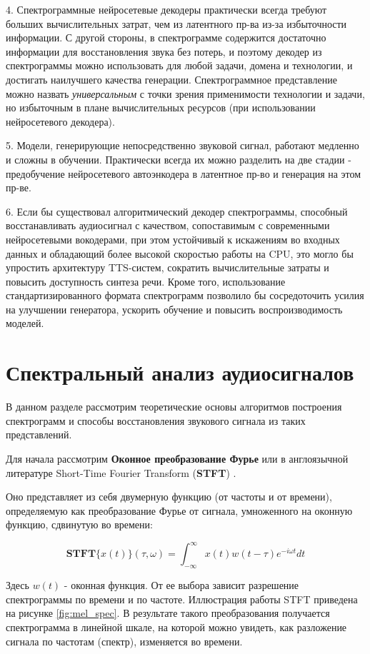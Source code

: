 4. Спектрограммные нейросетевые декодеры практически всегда требуют больших вычислительных затрат, чем из латентного пр-ва из-за избыточности информации. 
С другой стороны, в спектрограмме содержится достаточно информации для восстановления звука без потерь, 
и поэтому декодер из спектрограммы можно использовать для любой задачи, домена и технологии, и достигать наилучшего качества генерации.
Спектрограммное представление можно назвать \textit{универсальным} с точки зрения применимости технологии и задачи, но избыточным в плане вычислительных ресурсов 
(при использовании нейросетевого декодера).

5. Модели, генерирующие непосредственно звуковой сигнал, работают медленно и сложны в обучении. Практически всегда их можно разделить на две стадии - предобучение нейросетевого автоэнкодера в латентное пр-во и генерация на этом пр-ве.

6. Если бы существовал алгоритмический декодер спектрограммы, способный восстанавливать аудиосигнал с качеством, 
сопоставимым с современными нейросетевыми вокодерами, при этом устойчивый к искажениям во входных данных и обладающий более высокой скоростью работы на CPU, 
это могло бы упростить архитектуру TTS-систем, сократить вычислительные затраты и повысить доступность синтеза речи. 
Кроме того, использование стандартизированного формата спектрограмм позволило бы сосредоточить усилия на улучшении генератора, 
ускорить обучение и повысить воспроизводимость моделей.


\section{Спектральный анализ аудиосигналов}
В данном разделе рассмотрим теоретические основы алгоритмов построения спектрограмм и способы восстановления звукового сигнала из таких представлений.

Для начала рассмотрим \textbf{Оконное преобразование Фурье} или в англоязычной литературе Short-Time Fourier Transform (\textbf{STFT}) \cite{STFT}.

Оно представляет из себя двумерную функцию (от частоты и от времени), определяемую как преобразование Фурье от сигнала, умноженного на оконную функцию, сдвинутую во времени:

\begin{equation}
  \textbf{STFT}\{x(t)\} (\tau, \omega) = \int_{-\infty}^\infty x(t) w(t - \tau) e^{-i\omega t} dt
\end{equation}

Здесь \(w(t)\) - оконная функция. От ее выбора зависит разрешение спектрограммы по времени и по частоте. Иллюстрация работы STFT приведена на рисунке \ref{fig:mel_spec}.
В результате такого преобразования получается спектрограмма в линейной шкале, на которой можно увидеть, как разложение сигнала по частотам (спектр), изменяется во времени.

